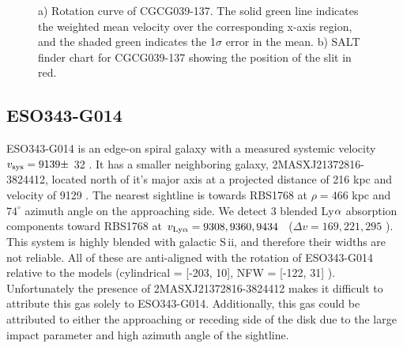 \begin{figure}[ht!]
\centering
  \caption{\small{a) Rotation curve of CGCG039-137. The solid green line indicates the weighted mean velocity over the corresponding x-axis region, and the shaded green indicates the 1$\sigma$ error in the mean. b) SALT finder chart for CGCG039-137 showing the position of the slit in red.}}
\vspace{0pt}
\end{figure}


\subsection{ESO343-G014}
ESO343-G014 is an edge-on spiral galaxy with a measured systemic velocity $v_{\rm sys} = 9139 \pm$ 32 \kms. It has a smaller neighboring galaxy, 2MASXJ21372816-3824412, located north of it's major axis at a projected distance of 216 kpc and velocity of 9129 \kms. The nearest sightline is towards RBS1768 at $\rho = 466$ kpc and $74^{\circ}$ azimuth angle on the approaching side. We detect 3 blended Ly$\rm \alpha$ absorption components toward RBS1768 at $v_{\rm Ly\alpha} = 9308, 9360, 9434$ \kms~($\Delta v = 169, 221, 295$ \kms). This system is highly blended with galactic S\,{\sc ii}, and therefore their widths are not reliable. All of these are anti-aligned with the rotation of ESO343-G014 relative to the models (cylindrical = [-203, 10], NFW = [-122, 31] \kms). Unfortunately the presence of 2MASXJ21372816-3824412 makes it difficult to attribute this gas solely to ESO343-G014. Additionally, this gas could be attributed to either the approaching or receding side of the disk due to the large impact parameter and high azimuth angle of the sightline.

